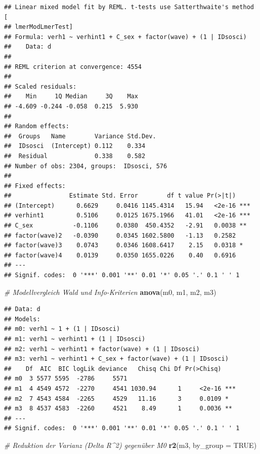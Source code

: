 \documentclass[
]{book}
\newenvironment{Shaded}{\begin{snugshade}}{\end{snugshade}}
\newcommand{\CommentTok}[1]{\textcolor[rgb]{0.56,0.35,0.01}{\textit{#1}}}
\newcommand{\DataTypeTok}[1]{\textcolor[rgb]{0.13,0.29,0.53}{#1}}
\newcommand{\KeywordTok}[1]{\textcolor[rgb]{0.13,0.29,0.53}{\textbf{#1}}}
\newcommand{\NormalTok}[1]{#1}
\newcommand{\OtherTok}[1]{\textcolor[rgb]{0.56,0.35,0.01}{#1}}
\begin{document}
\begin{verbatim}
## Linear mixed model fit by REML. t-tests use Satterthwaite's method [
## lmerModLmerTest]
## Formula: verh1 ~ verhint1 + C_sex + factor(wave) + (1 | IDsosci)
##    Data: d
## 
## REML criterion at convergence: 4554
## 
## Scaled residuals: 
##    Min     1Q Median     3Q    Max 
## -4.609 -0.244 -0.058  0.215  5.930 
## 
## Random effects:
##  Groups   Name        Variance Std.Dev.
##  IDsosci  (Intercept) 0.112    0.334   
##  Residual             0.338    0.582   
## Number of obs: 2304, groups:  IDsosci, 576
## 
## Fixed effects:
##                Estimate Std. Error        df t value Pr(>|t|)    
## (Intercept)      0.6629     0.0416 1145.4314   15.94   <2e-16 ***
## verhint1         0.5106     0.0125 1675.1966   41.01   <2e-16 ***
## C_sex           -0.1106     0.0380  450.4352   -2.91   0.0038 ** 
## factor(wave)2   -0.0390     0.0345 1602.5800   -1.13   0.2582    
## factor(wave)3    0.0743     0.0346 1608.6417    2.15   0.0318 *  
## factor(wave)4    0.0139     0.0350 1655.0226    0.40   0.6916    
## ---
## Signif. codes:  0 '***' 0.001 '**' 0.01 '*' 0.05 '.' 0.1 ' ' 1
\end{verbatim}

\begin{Shaded}
\begin{Highlighting}[]
\CommentTok{# Modellvergleich Wald und Info-Kriterien}
\KeywordTok{anova}\NormalTok{(m0, m1, m2, m3)}
\end{Highlighting}
\end{Shaded}

\begin{verbatim}
## Data: d
## Models:
## m0: verh1 ~ 1 + (1 | IDsosci)
## m1: verh1 ~ verhint1 + (1 | IDsosci)
## m2: verh1 ~ verhint1 + factor(wave) + (1 | IDsosci)
## m3: verh1 ~ verhint1 + C_sex + factor(wave) + (1 | IDsosci)
##    Df  AIC  BIC logLik deviance   Chisq Chi Df Pr(>Chisq)    
## m0  3 5577 5595  -2786     5571                              
## m1  4 4549 4572  -2270     4541 1030.94      1     <2e-16 ***
## m2  7 4543 4584  -2265     4529   11.16      3     0.0109 *  
## m3  8 4537 4583  -2260     4521    8.49      1     0.0036 ** 
## ---
## Signif. codes:  0 '***' 0.001 '**' 0.01 '*' 0.05 '.' 0.1 ' ' 1
\end{verbatim}

\begin{Shaded}
\begin{Highlighting}[]
\CommentTok{# Reduktion der Varianz (Delta R^2) gegenüber M0}
\KeywordTok{r2}\NormalTok{(m3, }\DataTypeTok{by_group =} \OtherTok{TRUE}\NormalTok{)}
\end{Highlighting}
\end{Shaded}
\end{document}
